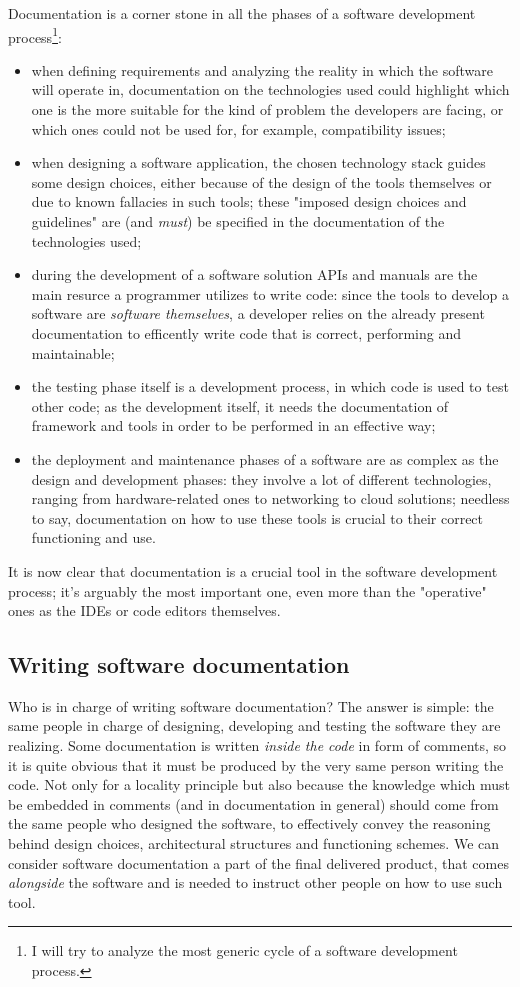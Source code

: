 \documentclass{article}
\begin{document}
			Documentation is a corner stone in all the phases of a software development process\footnote{I will try to analyze the most generic cycle of a software development process.}:
			\begin{itemize}
				\item when defining requirements and analyzing the reality in which the software will operate in, documentation on the technologies used could highlight which one is the more suitable for the kind of problem the developers are facing, or which ones could not be used for, for example, compatibility issues;
				\item when designing a software application, the chosen technology stack guides some design choices, either because of the design of the tools themselves or due to known fallacies in such tools; these "imposed design choices and guidelines" are (and \textit{must}) be specified in the documentation of the technologies used;
				\item during the development of a software solution APIs and manuals are the main resurce a programmer utilizes to write code: since the tools to develop a software are \textit{software themselves}, a developer relies on the already present documentation to efficently write code that is correct, performing and maintainable;
				\item the testing phase itself is a development process, in which code is used to test other code; as the development itself, it needs the documentation of framework and tools in order to be performed in an effective way;
				\item the deployment and maintenance phases of a software are as complex as the design and development phases: they involve a lot of different technologies, ranging from hardware-related ones to networking to cloud solutions; needless to say, documentation on how to use these tools is crucial to their correct functioning and use.
			\end{itemize}
			It is now clear that documentation is a crucial tool in the software development process; it's arguably the most important one, even more than the "operative" ones as the IDEs or code editors themselves.

		\subsection{Writing software documentation}
			Who is in charge of writing software documentation? The answer is simple: the same people in charge of designing, developing and testing the software they are realizing. Some documentation is written \textit{inside the code} in form of comments, so it is quite obvious that it must be produced by the very same person writing the code. Not only for a locality principle but also because the knowledge which must be embedded in comments (and in documentation in general) should come from the same people who designed the software, to effectively convey the reasoning behind design choices, architectural structures and functioning schemes. We can consider software documentation a part of the final delivered product, that comes \textit{alongside} the software and is needed to instruct other people on how to use such tool.
\end{document}
